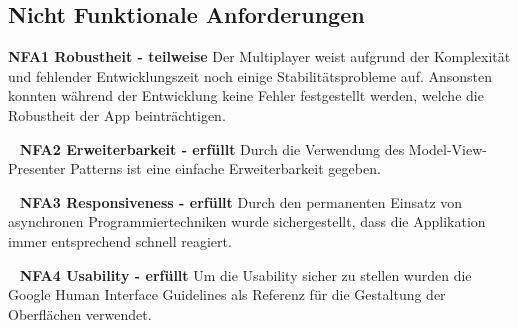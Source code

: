 \documentclass{scrartcl}
\begin{document}
\subsection{Nicht Funktionale Anforderungen}

\textbf{NFA1 Robustheit - teilweise} \newline
Der Multiplayer weist aufgrund der Komplexität und fehlender Entwicklungszeit
noch einige Stabilitätsprobleme auf. Ansonsten konnten während der Entwicklung
keine Fehler festgestellt werden, welche die Robustheit der App beinträchtigen.

\ \newline
\textbf{NFA2 Erweiterbarkeit - erfüllt} \newline
Durch die Verwendung des Model-View-Presenter Patterns ist eine einfache
Erweiterbarkeit gegeben.

\ \newline
\textbf{NFA3 Responsiveness - erfüllt} \newline
Durch den permanenten Einsatz von asynchronen Programmiertechniken wurde
sichergestellt, dass die Applikation immer entsprechend schnell reagiert.

\ \newline
\textbf{NFA4 Usability - erfüllt} \newline
Um die Usability sicher zu stellen wurden die Google Human Interface Guidelines
als Referenz für die Gestaltung der Oberflächen verwendet.
\end{document}
